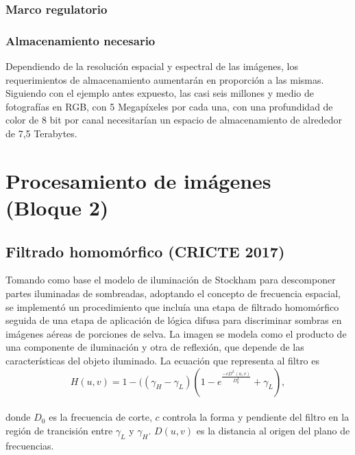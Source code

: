 \subsubsection{Marco regulatorio} %

\subsubsection{Almacenamiento necesario} %
Dependiendo de la resolución espacial y espectral de las imágenes, los requerimientos de almacenamiento aumentarán en proporción a las mismas. Siguiendo con el ejemplo antes expuesto, las casi seis millones y medio de fotografías en RGB, con 5 Megapíxeles por cada una, con una profundidad de color de 8 bit por canal necesitarían un espacio de almacenamiento de alrededor de 7,5 Terabytes.

\section{Procesamiento de imágenes (Bloque 2)}
\subsection{Filtrado homomórfico (CRICTE 2017)}
Tomando como base el modelo de iluminación de Stockham para descomponer partes iluminadas de sombreadas, adoptando el concepto de frecuencia espacial, se implementó un procedimiento que incluía una etapa de filtrado homomórfico seguida de una etapa de aplicación de lógica difusa para discriminar sombras en imágenes aéreas de porciones de selva.
La imagen se modela como el producto de una componente de iluminación y otra de reflexión, que depende de las características del objeto iluminado. 
La ecuación que representa al filtro es
\\
\begin{equation}
	H(u,v)=1-((\gamma_H-\gamma_L)(1-e^{\frac{-cD^L(u,v)}{D^L_0}}+\gamma_L),\label{filtro homomorfico}
\end{equation}
\\

donde $D_0$ es la frecuencia de corte, $c$ controla la forma y pendiente del filtro en la región de trancisión entre $\gamma_L$ y $\gamma_H$. $D(u,v)$ es la distancia al origen del plano de frecuencias.

